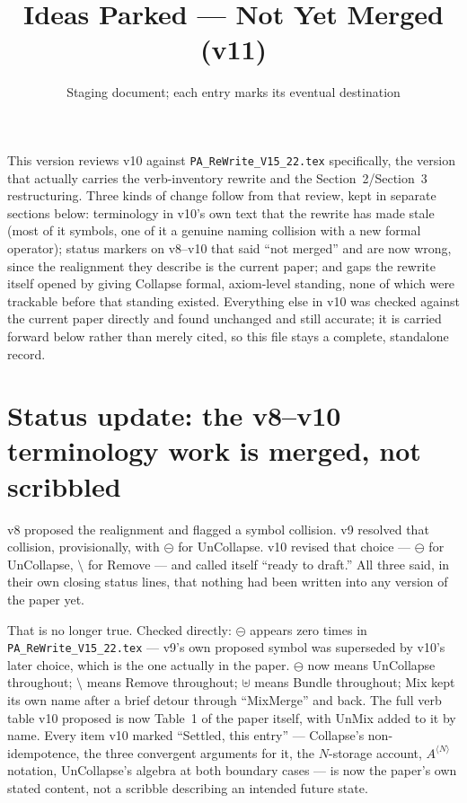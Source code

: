 \documentclass[11pt]{article}
\title{Ideas Parked --- Not Yet Merged (v11)}
\author{Staging document; each entry marks its eventual destination}
\date{}
\begin{document}
\maketitle

\noindent This version reviews v10 against \texttt{PA\_ReWrite\_V15\_22.tex}
specifically, the version that actually carries the verb-inventory
rewrite and the Section~2/Section~3 restructuring. Three kinds of
change follow from that review, kept in separate sections below:
terminology in v10's own text that the rewrite has made stale (most of
it symbols, one of it a genuine naming collision with a new formal
operator); status markers on v8--v10 that said ``not merged'' and are
now wrong, since the realignment they describe is the current paper;
and gaps the rewrite itself opened by giving Collapse formal,
axiom-level standing, none of which were trackable before that
standing existed. Everything else in v10 was checked against the
current paper directly and found unchanged and still accurate; it is
carried forward below rather than merely cited, so this file stays a
complete, standalone record.

\section{Status update: the v8--v10 terminology work is merged, not
scribbled}

v8 proposed the realignment and flagged a symbol collision. v9
resolved that collision, provisionally, with $\circleddash$ for
UnCollapse. v10 revised that choice --- $\ominus$ for UnCollapse,
$\setminus$ for Remove --- and called itself ``ready to draft.'' All
three said, in their own closing status lines, that nothing had been
written into any version of the paper yet.

That is no longer true. Checked directly: $\circleddash$ appears zero
times in \texttt{PA\_ReWrite\_V15\_22.tex} --- v9's own proposed symbol
was superseded by v10's later choice, which is the one actually in the
paper. $\ominus$ now means UnCollapse throughout; $\setminus$ means
Remove throughout; $\uplus$ means Bundle throughout; Mix kept its own
name after a brief detour through ``MixMerge'' and back. The full
verb table v10 proposed is now Table~1 of the paper itself, with UnMix
added to it by name. Every item v10 marked ``Settled, this entry'' ---
Collapse's non-idempotence, the three convergent arguments for it, the
$N$-storage account, $A^{\langle N\rangle}$ notation, UnCollapse's
algebra at both boundary cases --- is now the paper's own stated
content, not a scribble describing an intended future state.
\end{document}
